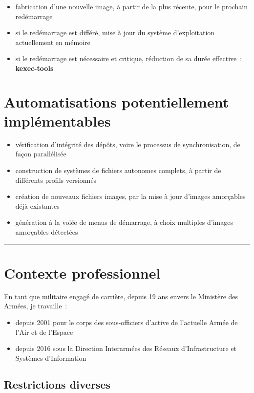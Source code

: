 \documentclass[10pt]{article}
\newcommand{\hr}{\rule{\textwidth}{1pt}}
\newenvironment{itmz}{\begin{itemize}
\setlength{\itemsep}{0em}
}{\end{itemize}}
\begin{document}
\begin{itmz}
\item{fabrication d’une nouvelle image, à partir de la plus récente, pour le prochain redémarrage}
\item{si le redémarrage est différé, mise à jour du système d’exploitation actuellement en mémoire}
\item{si le redémarrage est nécessaire et critique, réduction de sa durée effective : \textbf{kexec-tools}}
\end{itmz}

\section{Automatisations potentiellement implémentables}

\begin{itmz}
\item{vérification d’intégrité des dépôts, voire le processus de synchronisation, de façon parallélisée}
\item{construction de systèmes de fichiers autonomes complets, à partir de différents profils versionnés}
\item{création de nouveaux fichiers images, par la mise à jour d’images amorçables déjà existantes}
\item{génération à la volée de menus de démarrage, à choix multiples d’images amorçables détectées}
\end{itmz}

\hr

\appendix

\section{Contexte professionnel}

En tant que militaire engagé de carrière, depuis 19 ans envers le Ministère des Armées, je travaille :
\begin{itmz}
\item{depuis 2001 pour le corps des sous-officiers d’active de l’actuelle Armée de l’Air et de l’Espace}
\item{depuis 2016 sous la Direction Interarmées des Réseaux d’Infrastructure et Systèmes d’Information}
\end{itmz}

\subsection{Restrictions diverses}
\end{document}
